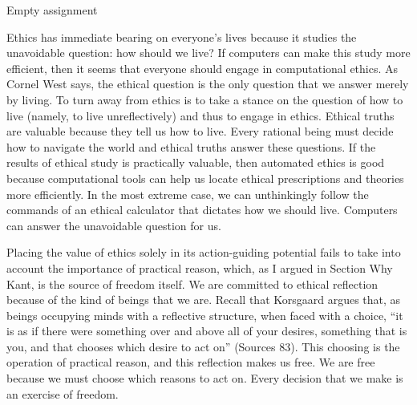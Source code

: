 \begin{isabellebody}
{  Empty assignment
\color{black}%
}%
\endisatagproof
{\isafoldproof}%
%
\isadelimproof
%
\endisadelimproof
%
\isadelimdocument
%
\endisadelimdocument
%
\isatagdocument
%
\isamarkuptrue%
%
\endisatagdocument
{\isafolddocument}%
%
\isadelimdocument
%
\endisadelimdocument
%
\begin{isamarkuptext}%
Ethics has immediate bearing on everyone’s lives because it studies the unavoidable question: 
how should we live? If computers can make this study more efficient, then it seems that everyone should
engage in computational ethics. As Cornel West says, the ethical question is the only question that 
we answer merely by living. To turn away from ethics is to take a stance on the question of how to 
live (namely, to live unreflectively) and thus to engage in ethics. Ethical truths are valuable because 
they tell us how to live. Every rational being must decide how to navigate the world and ethical 
truths answer these questions. If the results of ethical study is practically valuable, then automated 
ethics is good because computational tools can help us locate ethical prescriptions and theories more efficiently. 
In the most extreme case, we can unthinkingly follow the commands of an ethical calculator that dictates 
how we should live. Computers can answer the unavoidable question for us.

Placing the value of ethics solely in its action-guiding potential fails to take into account the 
importance of practical reason, which, as I argued in Section Why Kant, is the source
of freedom itself. 
We are committed to ethical reflection because of the kind of beings that we are. Recall that Korsgaard 
argues that, as beings occupying minds with a reflective structure, when faced with a choice, “it is as if there 
were something over and above all of your desires, something that is you, and that chooses which desire 
to act on” (Sources 83). This choosing is the operation of practical reason, and this reflection
makes us free. We are free because we must choose which reasons to act on. Every decision that we 
make is an exercise of freedom. 


\end{isamarkuptext}
\end{isabellebody}

